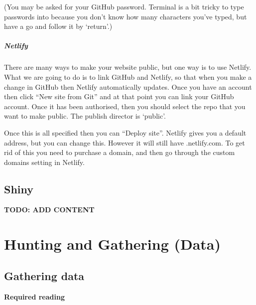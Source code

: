 \documentclass[
]{book}
\begin{document}
(You may be asked for your GitHub password. Terminal is a bit tricky to type passwords into because you don't know how many characters you've typed, but have a go and follow it by `return'.)

\hypertarget{netlify}{%
\subsubsection{Netlify}\label{netlify}}

There are many ways to make your website public, but one way is to use Netlify. What we are going to do is to link GitHub and Netlify, so that when you make a change in GitHub then Netlify automatically updates. Once you have an account then click ``New site from Git'' and at that point you can link your GitHub account. Once it has been authorised, then you should select the repo that you want to make public. The publish director is `public'.

Once this is all specified then you can ``Deploy site''. Netlify gives you a default address, but you can change this. However it will still have .netlify.com. To get rid of this you need to purchase a domain, and then go through the custom domains setting in Netlify.

\hypertarget{shiny}{%
\chapter{Shiny}\label{shiny}}

\textbf{TODO: ADD CONTENT}

\hypertarget{part-hunting-and-gathering-data}{%
\part{Hunting and Gathering (Data)}\label{part-hunting-and-gathering-data}}

\hypertarget{gathering-data}{%
\chapter{Gathering data}\label{gathering-data}}

\textbf{Required reading}
\end{document}
